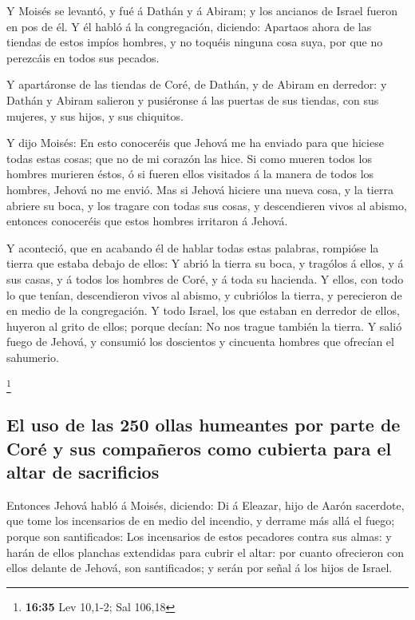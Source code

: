  Y Moisés se levantó, y fué á Dathán y á Abiram; y los
ancianos de Israel fueron en pos de él.  Y él habló á la
congregación, diciendo: Apartaos ahora de las tiendas de estos impíos
hombres, y no toquéis ninguna cosa suya, por que no perezcáis en todos
sus pecados.

 Y apartáronse de las tiendas de Coré, de Dathán, y de
Abiram en derredor: y Dathán y Abiram salieron y pusiéronse á las
puertas de sus tiendas, con sus mujeres, y sus hijos, y sus chiquitos.

 Y dijo Moisés: En esto conoceréis que Jehová me ha
enviado para que hiciese todas estas cosas; que no de mi corazón las
hice.  Si como mueren todos los hombres murieren éstos, ó
si fueren ellos visitados á la manera de todos los hombres, Jehová no me
envió.  Mas si Jehová hiciere una nueva cosa, y la tierra
abriere su boca, y los tragare con todas sus cosas, y descendieren vivos
al abismo, entonces conoceréis que estos hombres irritaron á Jehová.

 Y aconteció, que en acabando él de hablar todas estas
palabras, rompióse la tierra que estaba debajo de ellos: 
Y abrió la tierra su boca, y tragólos á ellos, y á sus casas, y á todos
los hombres de Coré, y á toda su hacienda.  Y ellos, con
todo lo que tenían, descendieron vivos al abismo, y cubriólos la tierra,
y perecieron de en medio de la congregación.  Y todo
Israel, los que estaban en derredor de ellos, huyeron al grito de ellos;
porque decían: No nos trague también la tierra.  Y salió
fuego de Jehová, y consumió los doscientos y cincuenta hombres que
ofrecían el sahumerio.

\footnote{\textbf{16:35} Lev 10,1-2; Sal 106,18}

\hypertarget{el-uso-de-las-250-ollas-humeantes-por-parte-de-coruxe9-y-sus-compauxf1eros-como-cubierta-para-el-altar-de-sacrificios}{%
\subsection{El uso de las 250 ollas humeantes por parte de Coré y sus
compañeros como cubierta para el altar de
sacrificios}\label{el-uso-de-las-250-ollas-humeantes-por-parte-de-coruxe9-y-sus-compauxf1eros-como-cubierta-para-el-altar-de-sacrificios}}

 Entonces Jehová habló á Moisés, diciendo:
 Di á Eleazar, hijo de Aarón sacerdote, que tome los
incensarios de en medio del incendio, y derrame más allá el fuego;
porque son santificados:  Los incensarios de estos
pecadores contra sus almas: y harán de ellos planchas extendidas para
cubrir el altar: por cuanto ofrecieron con ellos delante de Jehová, son
santificados; y serán por señal á los hijos de Israel.

